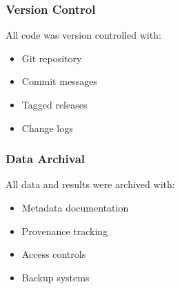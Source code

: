 \subsubsection{Version Control}
All code was version controlled with:
\begin{itemize}
    \item Git repository
    \item Commit messages
    \item Tagged releases
    \item Change logs
\end{itemize}

\subsubsection{Data Archival}
All data and results were archived with:
\begin{itemize}
    \item Metadata documentation
    \item Provenance tracking
    \item Access controls
    \item Backup systems
\end{itemize}

